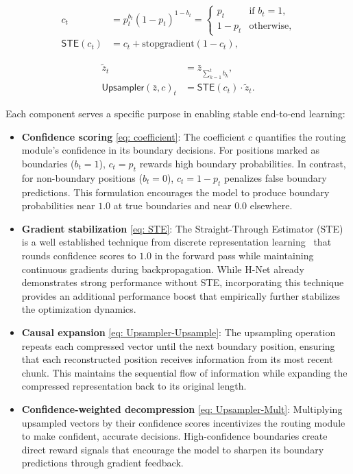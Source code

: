 \documentclass{article}
\newcommand{\citep}{\parencite}
\newcommand{\model}{H-Net}
\newcommand{\router}{routing module}
\theoremstyle{plain}
\theoremstyle{remark}
\begin{document}
\begin{minipage}[t]{.48\linewidth}
\vspace{-3mm}
  \begin{align}
    \label{eq: coefficient}
    c_t &= p_t^{b_t} (1-p_t)^{1-b_t}
    = \begin{cases}
        p_t & \text{if } b_t=1,\\
        1 - p_t & \text{otherwise},
    \end{cases}\\
    \label{eq: STE}
    \mathsf{STE}(c_t) &= c_t + \text{stopgradient}(1-c_t),
  \end{align}
\end{minipage}\hfill
\begin{minipage}[t]{.51\linewidth}
  \begin{align}
    \label{eq: Upsampler-Upsample}
    \tilde{z}_t &= \bar{z}_{\sum_{k=1}^t b_k},\\
    \label{eq: Upsampler-Mult}
    \mathsf{Upsampler}(\bar{z}, c)_t &= \mathsf{STE}\left(c_t\right) \cdot \tilde{z}_t.
  \end{align}
\end{minipage}

Each component serves a specific purpose in enabling stable end-to-end learning:
\begin{itemize}
    \item \textbf{Confidence scoring} \eqref{eq: coefficient}: The coefficient $c$ quantifies the \router{}'s confidence in its boundary decisions.
    For positions marked as boundaries ($b_t=1$), $c_t=p_t$ rewards high boundary probabilities.
    In contrast, for non-boundary positions ($b_t=0$), $c_t=1-p_t$ penalizes false boundary predictions.
    This formulation encourages the model to produce boundary probabilities near $1.0$ at true boundaries and near $0.0$ elsewhere.
    \item \textbf{Gradient stabilization} \eqref{eq: STE}: The Straight-Through Estimator (STE)~\citep{STE} is a well established technique from discrete representation learning~\citep{VQ-VAE, GumbelSoftmax} that rounds confidence scores to $1.0$ in the forward pass while maintaining continuous gradients during backpropagation.
    While \model{} already demonstrates strong performance without STE, incorporating this technique provides an additional performance boost that empirically further stabilizes the optimization dynamics.
    \item \textbf{Causal expansion} \eqref{eq: Upsampler-Upsample}: The upsampling operation repeats each compressed vector until the next boundary position, ensuring that each reconstructed position receives information from its most recent chunk.
    This maintains the sequential flow of information while expanding the compressed representation back to its original length.
    \item \textbf{Confidence-weighted decompression} \eqref{eq: Upsampler-Mult}:
    Multiplying upsampled vectors by their confidence scores incentivizes the \router{} to make confident, accurate decisions.
    High-confidence boundaries create direct reward signals that encourage the model to sharpen its boundary predictions through gradient feedback.
\end{itemize}
\end{document}
